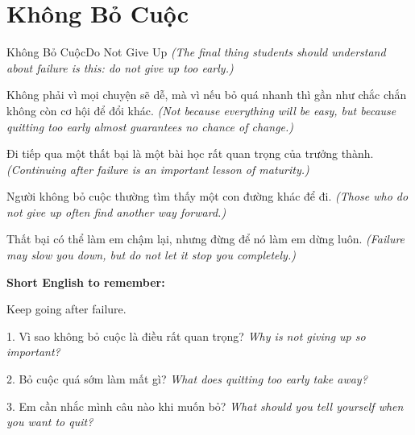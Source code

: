 \section{Không Bỏ Cuộc}
\begin{truyen}{Không Bỏ Cuộc}{Do Not Give Up}
\textit{(The final thing students should understand about failure is this: do not give up too early.)}

Không phải vì mọi chuyện sẽ dễ, mà vì nếu bỏ quá nhanh thì gần như chắc chắn không còn cơ hội để đổi khác.
\textit{(Not because everything will be easy, but because quitting too early almost guarantees no chance of change.)}

Đi tiếp qua một thất bại là một bài học rất quan trọng của trưởng thành.
\textit{(Continuing after failure is an important lesson of maturity.)}

Người không bỏ cuộc thường tìm thấy một con đường khác để đi.
\textit{(Those who do not give up often find another way forward.)}
\end{truyen}

\begin{baihoc}
Thất bại có thể làm em chậm lại, nhưng đừng để nó làm em dừng luôn.
\textit{(Failure may slow you down, but do not let it stop you completely.)}
\end{baihoc}

\begin{ghinhoanh}
\textbf{Short English to remember:}

Keep going after failure.

\end{ghinhoanh}

\begin{tuhocnhanh}
1. Vì sao không bỏ cuộc là điều rất quan trọng? \textit{Why is not giving up so important?}

2. Bỏ cuộc quá sớm làm mất gì? \textit{What does quitting too early take away?}

3. Em cần nhắc mình câu nào khi muốn bỏ? \textit{What should you tell yourself when you want to quit?}
\end{tuhocnhanh}
\ngancach
